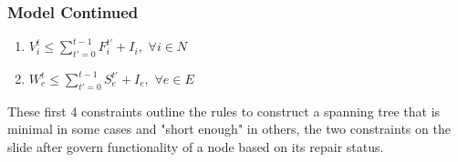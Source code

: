 \documentclass[t, pdftex]{beamer}
\begin{document}
\begin{frame}
\frametitle{Model Continued}
\begin{enumerate}[label=(\arabic*), leftmargin=*, itemsep=0.4ex, before={\everymath{\displaystyle}}]
\item $V_i^t \leq \sum_{t'=0}^{t-1} F_i^{t'}+I_i, \hspace{4pt} \forall i \in N$ 
\item $W_{e}^t \leq \sum_{t'=0}^{t-1} S_{e}^{t'}+I_e, \hspace{4pt} \forall e \in E $
\end{enumerate}
These first 4 constraints outline the rules to construct a spanning tree that is minimal in some cases and "short enough" in others, the two constraints on the slide after govern functionality of a node based on its repair status.
\end{frame}
\end{document}
